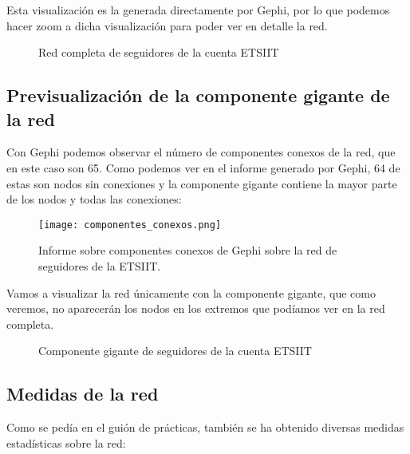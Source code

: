 Esta visualización es la generada directamente por Gephi, por lo que podemos hacer zoom a dicha visualización para poder ver en detalle la red.

\newpage
\begin{figure}[H]
	\centering
	
	\caption{Red completa de seguidores de la cuenta ETSIIT}
\end{figure}
\newpage


\subsection{Previsualización de la componente gigante de la red}

Con Gephi podemos observar el número de componentes conexos de la red, que en este caso son 65. Como podemos ver en el informe generado por Gephi, 64 de estas son nodos sin conexiones y la componente gigante contiene la mayor parte de los nodos y todas las conexiones:


\begin{figure}[H]
  \centering
  \texttt{[image: componentes\_conexos.png]}
  \caption{Informe sobre componentes conexos de Gephi sobre la red de seguidores de la ETSIIT.}
  \label{fig:componentes_conexos}
\end{figure}

Vamos a visualizar la red únicamente con la componente gigante, que como veremos, no aparecerán los nodos en los extremos que podíamos ver en la red completa.

\newpage
\begin{figure}[H]
	\centering
	
	\caption{Componente gigante de seguidores de la cuenta ETSIIT}
\end{figure}
\newpage

\subsection{Medidas de la red}

Como se pedía en el guión de prácticas, también se ha obtenido diversas medidas estadísticas sobre la red:

